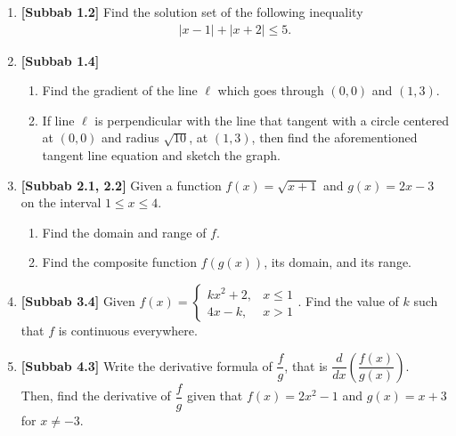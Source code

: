 \documentclass[10pt,openany,a4paper]{article}
\theoremstyle{definition}
\theoremstyle{definition}
\theoremstyle{plain}
\begin{document}
\newpage

\begin{enumerate}
    \item \textbf{[Subbab 1.2]} Find the solution set of the following inequality
    \begin{align*}
        |x-1|+|x+2|\leq 5.
    \end{align*}

    \item \textbf{[Subbab 1.4]} \begin{enumerate}
        \item Find the gradient of the line $\ell$ which goes through $(0,0)$ and $(1,3)$.
        \item If line $\ell$ is perpendicular with the line that tangent with a circle centered at $(0,0)$ and radius $\sqrt{10}$, at $(1,3)$, then find the aforementioned tangent line equation and sketch the graph.
    \end{enumerate}

    \item \textbf{[Subbab 2.1, 2.2]} Given a function $f(x)=\sqrt{x+1}$ and $g(x)=2x-3$ on the interval $1\leq x\leq 4$.
    \begin{enumerate}
        \item Find the domain and range of $f$.
        \item Find the composite function $f(g(x))$, its domain, and its range.
    \end{enumerate}

    \item \textbf{[Subbab 3.4]} Given $f(x)=\begin{cases}
        kx^2+2, & x\leq 1\\
        4x-k, & x>1
    \end{cases}$. Find the value of $k$ such that $f$ is continuous everywhere.

    \item \textbf{[Subbab 4.3]} Write the derivative formula of $\dfrac{f}{g}$, that is $\dfrac{d}{dx}\left(\dfrac{f(x)}{g(x)}\right)$.\\
    Then, find the derivative of $\dfrac{f}{g}$ given that $f(x)=2x^2-1$ and $g(x)=x+3$ for $x\neq -3$.
\end{enumerate}
\end{document}
